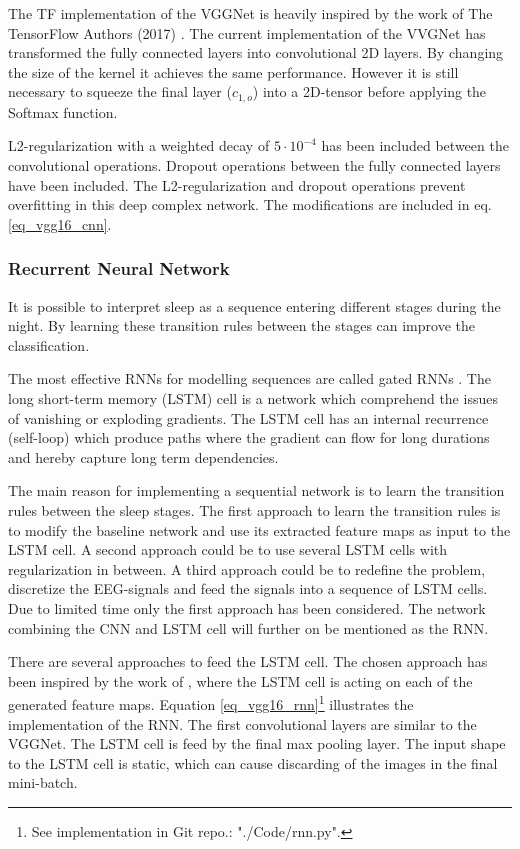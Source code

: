 The TF implementation of the VGGNet is heavily inspired by the work of The TensorFlow Authors (2017) \cite{git_vgg16}. 
The current implementation of the VVGNet has transformed the fully connected layers into convolutional 2D layers. By changing the size of the kernel it achieves the same performance. However it is still necessary to squeeze the final layer ($c_{1,o}$) into a 2D-tensor before applying the Softmax function.

L2-regularization with a weighted decay of $5 \cdot 10^{-4}$ has been included between the convolutional operations. Dropout operations between the fully connected layers have been included.
The L2-regularization and dropout operations prevent overfitting in this deep complex network. The modifications are included in eq. \ref{eq_vgg16_cnn}.
  


\subsubsection{Recurrent Neural Network}
It is possible to interpret sleep as a sequence entering different stages during the night. By learning these transition rules between the stages can improve the classification.

The most effective RNNs for modelling sequences are called gated RNNs \cite[sec. 10.10]{dl_book}. 
The long short-term memory (LSTM) cell is a network which comprehend the issues of vanishing or exploding gradients. The LSTM cell has an internal recurrence (self-loop) which produce paths where the gradient can flow for long durations and hereby capture long term dependencies.  

The main reason for implementing a sequential network is to learn the transition rules between the sleep stages.
The first approach to learn the transition rules is to modify the baseline network and use its extracted feature maps as input to the LSTM cell. A second approach could be to use several LSTM cells with regularization in between. A third approach could be to redefine the problem, discretize the EEG-signals and feed the signals into a sequence of LSTM cells.
Due to limited time only the first approach has been considered. The network combining the CNN and LSTM cell will further on be mentioned as the RNN.

There are several approaches to feed the LSTM cell. The chosen approach has been inspired by the work of \cite{git_rnn_cnn_1,43455}, where the LSTM cell is acting on each of the generated feature maps.
Equation \ref{eq_vgg16_rnn}\footnote{See implementation in Git repo.: "./Code/rnn.py".}  illustrates the implementation of the RNN. The first convolutional layers are similar to the VGGNet. The LSTM cell is feed by the final max pooling layer. The input shape to the LSTM cell is static, which can cause discarding of the images in the final mini-batch.

